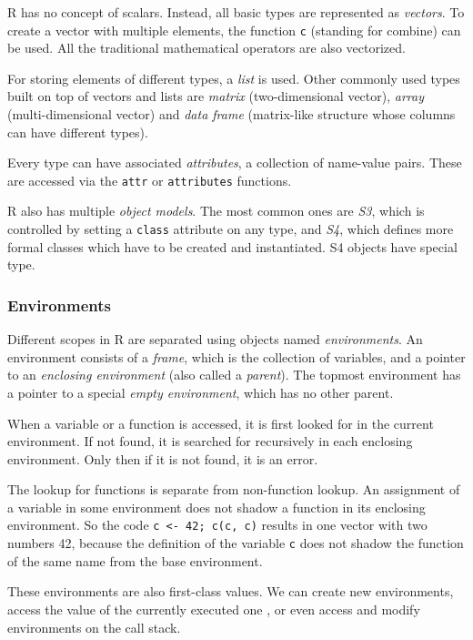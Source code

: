 R has no concept of scalars. Instead, all basic types are represented as \textit{vectors}. To create a vector with multiple elements, the function \texttt{c} (standing for combine) can be used. All the traditional mathematical operators are also vectorized.

For storing elements of different types, a \textit{list} is used. Other commonly used types built on top of vectors and lists are \textit{matrix} (two-dimensional vector), \textit{array} (multi-dimensional vector) and \textit{data frame} (matrix-like structure whose columns can have different types).

Every type can have associated \textit{attributes}, a collection of name-value pairs. These are accessed via the \texttt{attr} or \texttt{attributes} functions.

R also has multiple \textit{object models}. The most common ones are \textit{S3}, which is controlled by setting a \texttt{class} attribute on any type, and \textit{S4}, which defines more formal classes which have to be created and instantiated. S4 objects have special type.

\subsubsection*{Environments}

Different scopes in R are separated using objects named \textit{environments}. An environment consists of a \textit{frame}, which is the collection of variables, and a pointer to an \textit{enclosing environment} (also called a \textit{parent}). The topmost environment has a pointer to a special \textit{empty environment}, which has no other parent.

When a variable or a function is accessed, it is first looked for in the current environment. If not found, it is searched for recursively in each enclosing environment. Only then if it is not found, it is an error.

The lookup for functions is separate from non-function lookup. An assignment of a variable in some environment does not shadow a function in its enclosing environment. So the code \texttt{c <- 42; c(c, c)} results in one vector with two numbers 42, because the definition of the variable \texttt{c} does not shadow the function of the same name from the base environment.

These environments are also first-class values. We can create new environments, access the value of the currently executed one , or even access and modify environments on the call stack.

